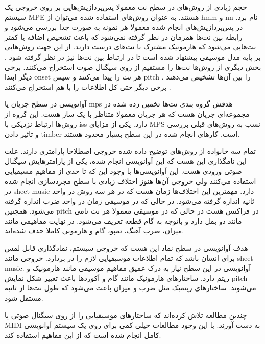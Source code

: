 حجم زیادی از روش‌های در سطح نت معمولا پس‌پردازیش‌هایی بر روی خروجی یک سیستم
\gls{MPE} هستند. به عنوان روش‌های استفاده شده می‌توان از \gls{hmm}
\cite{nam2011classification} و \gls{nn} \cite{boulanger2012modeling} نام برد. در
پس‌پردازیش‌های انجام شده معمولا هر نمونه به صورت جدا بررسی می‌شود و رابطه بین
نت‌ها همزمان در نظر گرفته نمی‌شود که باعث تشخیص اضافه یا کمتر نت‌هایی می‌شود که
هارمونیک مشترک با نت‌های درست دارند. از این جهت روش‌هایی بر پایه مدل موسیقی
پیشنهاد شده است تا در ارتباط بین نت‌ها نیز در نظر گرفته شود
\cite{boulanger2012modeling, sigtia2016end}. بخش دیگری از روش‌ها نت‌ها را مستقیم
از روی سیگنال صوت استخراج می‌کنند. برخی دیگر ابتدا onset هر نت را پیدا می‌کنند و
سپس \gls{pitch} را بین آن‌ها تشخیص می‌دهند \cite{marolt2004connectionist}. برخی
دیگر حتی کل اطلاعات را با هم استخراج می‌کنند
\cite{cogliati2016context,ewert2016piano,hawthorne2017onsets}.

آوانویسی در سطح جریان یا \gls{mps} هدفش گروه بندی نت‌ها تخمین زده شده در
مجموعه‌ای جریان هست که هر جریان معمولا متناظر با یک ساز هست. این گروه از روش‌ها
ارتباط نزدیکی با \gls{iss} دارد. یکی از مزایای \gls{MPS} نسب به روش‌های قبلی
بررسی و تاثیر دادن \gls{timber} است. کارهای انجام شده در این سطح بسیار محدود
هستند.

تمام سه خانواده از روش‌های‌ توضیح داده شده خروجی اصطلاحا پارامتری دارند. علت این
نامگذاری این هست که این آوانویسی انجام شده، یکی از پارامترهایش سیگنال صوتی ورودی
هست. این آوانویسی‌ها با وجود این که تا حدی از مفاهیم مسیقیایی استفاده می‌کنند
ولی خروجی آن‌ها هنوز اختلاف زیادی با سطح مجردسازی انجام شده در \gls{sheet music}
دارد. مهمترین این اختلاف‌ها زمان هست که در هر سه روش در واحد ثانیه اندازه گرفته
می‌شود. در حالی که در موسیقی زمان در واحد ضرب اندازه گرفته می‌شود. همچنین
\gls{pitch} در فراکنس هست در حالی که در موسیقی معمولا هر نت نامی مانند دو بمل
دارد و باتوجه به گام قطعه تعریف می‌شود. در نهایت مفاهیمی مانند میزان، ضرب آهنگ،
تمپو، گام و هارمونی کاملا حذف شده‌اند.

هدف آوانویسی در سطح نماد این هست که خروجی سیستم، نمادگذاری قابل لمس برای انسان
باشد که تمام اطلاعات موسیقیایی لازم را در بردارد. خروجی مانند \gls{sheet music}.
آوانویسی در این سطح نیاز به درک عمیق مفاهیم موسیقی مانند هارمونیک و ریتم دارد.
ساختارهای هارمونیک مانند گام و آکوردها باعث تغییر شکل نمایش \gls{pitch} می‌شوند.
ساختارهای ریتمیک مثل ضرب و میزان باعث می‌شود که طول نت‌ها از ثانیه مستقل شود.

چندین مطالعه تلاش کرده‌اند که ساختارهای موسیقیایی را از روی سیگنال صوتی یا
\gls{MIDI} به دست آورند. با این وجود مطالعات خیلی کمی برای روی یک سیستم
آوانویسی کامل انجام شده است که از این مفاهیم استفاده کند.

